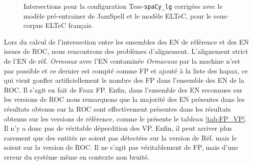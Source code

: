 \begin{figure}[h!]
\caption{Intersections pour la configuration Tess-\texttt{spaCy\_lg} corrigées avec le modèle pré-entrainer de JamSpell et le modèle ELTeC, pour le sous-corpus ELTeC français.}
\label{fig:intersection-globale-tess}
\end{figure}


Lors du calcul de l'intersection entre les ensembles des EN de référence et des EN issues de ROC, nous rencontrons des problèmes d'alignement. L'alignement strict de l'EN de réf. \textit{Ormeaux} avec l'EN contaminée \textit{Ormaeuux} par la machine n'est pas possible et ce dernier est compté comme FP et ajouté à la liste des hapax, ce qui vient gonfler artificiellement le nombre des FP dans l'ensemble des EN de la ROC. Il s'agit en fait de Faux FP. Enfin, dans l'ensemble des EN reconnues sur les versions de ROC nous remarquons que la majorité des EN présentes dans les résultats obtenus sur la ROC sont effectivement présentes dans les résultats obtenus sur les versions de référence, comme le présente le tableau \ref{tab:FP_VP}. Il n'y a donc pas de véritable déperdition des VP. Enfin, il peut arriver plus rarement que des entités ne soient pas détectées sur la version de Réf. mais le soient sur la version de ROC. Il ne s'agit pas véritablement de FP, mais d'une erreur du système même en contexte non bruité.



